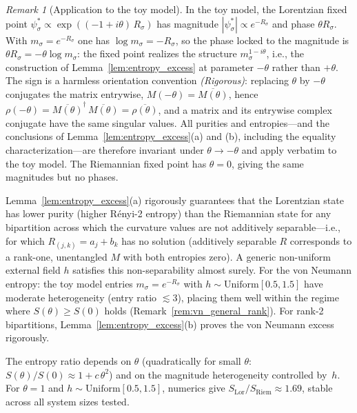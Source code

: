 \documentclass[12pt,a4paper]{article}
\theoremstyle{definition}
\theoremstyle{remark}
\newtheorem{remark}{Remark}
\begin{document}
\begin{remark}[Application to the toy model]
\label{rem:entropy_application}
In the toy model, the Lorentzian fixed point
$\psi^*_\sigma \propto \exp((-1 + i\theta)\, R_\sigma)$ has magnitude
$|\psi^*_\sigma| \propto e^{-R_\sigma}$ and phase $\theta R_\sigma$.
With $m_\sigma = e^{-R_\sigma}$ one has $\log m_\sigma = -R_\sigma$,
so the phase locked to the magnitude is $\theta R_\sigma = -\theta
\log m_\sigma$: the fixed point realizes the structure
$m_\sigma^{1-i\theta}$, i.e., the construction of
Lemma~\ref{lem:entropy_excess} at parameter $-\theta$ rather than
$+\theta$. The sign is a harmless orientation convention
\emph{(Rigorous)}: replacing $\theta$ by $-\theta$ conjugates the
matrix entrywise, $M(-\theta) = \overline{M(\theta)}$, hence
$\rho(-\theta) = \overline{M(\theta)}^{\dagger}\,\overline{M(\theta)}
= \overline{\rho(\theta)}$, and a matrix and its entrywise complex
conjugate have the same singular values. All purities and
entropies---and the conclusions of Lemma~\ref{lem:entropy_excess}(a)
and (b), including the equality characterization---are therefore
invariant under $\theta \to -\theta$ and apply verbatim to the toy
model. The Riemannian fixed point has $\theta = 0$, giving the same
magnitudes but no phases.

Lemma~\ref{lem:entropy_excess}(a) rigorously guarantees that the
Lorentzian state has lower purity (higher R\'enyi-2 entropy) than the
Riemannian state for any bipartition across which the curvature values
are not additively separable---i.e., for which $R_{(j,k)} = a_j + b_k$
has no solution (additively separable $R$ corresponds to a rank-one,
unentangled $M$ with both entropies zero). A generic non-uniform
external field $h$ satisfies this non-separability almost surely.
For the von Neumann entropy: the toy model entries
$m_\sigma = e^{-R_\sigma}$ with $h \sim \mathrm{Uniform}[0.5, 1.5]$
have moderate heterogeneity (entry ratio $\lesssim 3$), placing them
well within the regime where $S(\theta) \geq S(0)$ holds
(Remark~\ref{rem:vn_general_rank}). For rank-2 bipartitions,
Lemma~\ref{lem:entropy_excess}(b) proves the von Neumann excess
rigorously.

The entropy ratio depends on $\theta$ (quadratically
for small $\theta$: $S(\theta)/S(0) \approx 1 + c\,\theta^2$) and on
the magnitude heterogeneity controlled by~$h$. For $\theta = 1$ and
$h \sim \mathrm{Uniform}[0.5, 1.5]$, numerics give
$S_{\mathrm{Lor}}/S_{\mathrm{Riem}} \approx 1.69$, stable across all
system sizes tested.
\end{remark}
\end{document}
